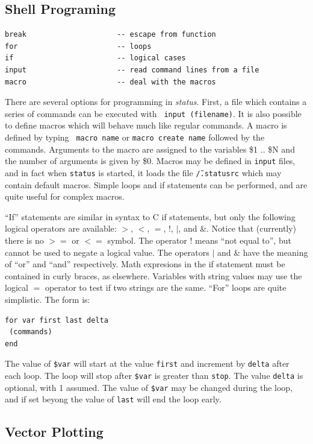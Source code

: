 \documentclass{article}
\newcommand\pr{\em}                   %
\begin{document}
\subsection{Shell Programing}
\begin{verbatim}
break                     -- escape from function 
for                       -- loops 
if                        -- logical cases 
input                     -- read command lines from a file 
macro                     -- deal with the macros 
\end{verbatim}

There are several options for programming in {\pr status}.  First, a
file which contains a series of commands can be executed with {\tt
  input (filename)}.  It is also possible to define macros which will
behave much like regular commands.  A macro is defined by typing {\tt
  macro name} or {\tt macro create name} followed by the commands.
Arguments to the macro are assigned to the variables \$1 .. \$N and
the number of arguments is given by \$0.  Macros may be defined in
{\tt input} files, and in fact when {\tt status} is started, it loads
the file {\tt \~/.statusrc} which may contain default macros.  Simple
loops and if statements can be performed, and are quite useful for
complex macros.  

``If'' statements are similar in syntax to C if statements, but only
the following logical operators are available: $>$, $<$, $=$, !, $|$,
and \&.  Notice that (currently) there is no $>=$ or $<=$ symbol.  The
operator ! means ``not equal to'', but cannot be used to negate a
logical value.  The operators $|$ and \& have the meaning of ``or'' and
``and'' respectively.  Math expresions in the if statement must be
contained in curly braces, as elsewhere.  Variables with string values
may use the logical $=$ operator to test if two strings are the same.
``For'' loops are quite simplistic.  The form is:
\begin{verbatim}
for var first last delta
 (commands)
end
\end{verbatim}
The value of {\tt \$var} will start at the value {\tt first} and increment by
{\tt delta} after each loop.  The loop will stop after {\tt \$var} is greater
than {\tt stop}.  The value {\tt delta} is optional, with 1 assumed.
The value of {\tt \$var} may be changed during the loop, and if set
beyong the value of {\tt last} will end the loop early.  

\subsection{Vector Plotting}
\end{document}
